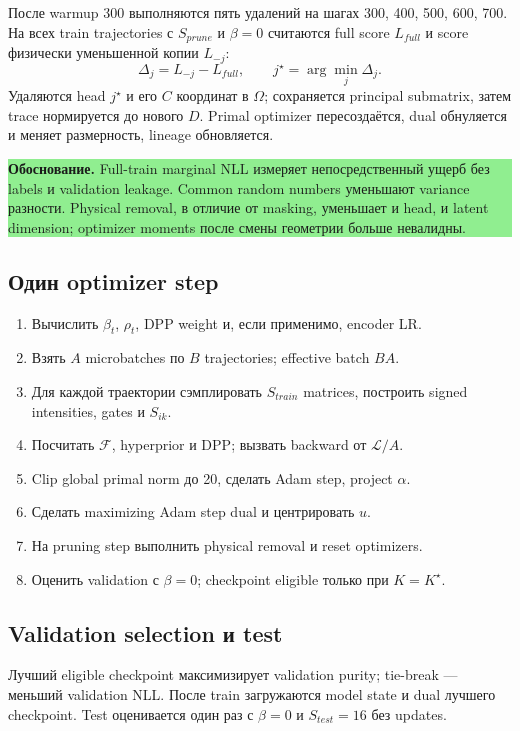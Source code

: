 \documentclass[11pt,a4paper]{article}
\newcommand{\Ktarget}{K^{\star}}
\newcommand{\boxnote}[2]{%
  \begin{center}\setlength{\fboxsep}{9pt}%
  \colorbox{#1}{\begin{minipage}{0.94\textwidth}\raggedright #2\par\end{minipage}}
  \end{center}}
\newcommand{\rationale}[1]{\boxnote{lightgreen}{\textbf{Обоснование.} #1}}
\begin{document}
После warmup 300 выполняются пять удалений на шагах 300, 400, 500, 600, 700.
На всех train trajectories с $S_{prune}$ и $\beta=0$ считаются full score
$L_{full}$ и score физически уменьшенной копии $L_{-j}$:
\[
\Delta_j=L_{-j}-L_{full},\qquad j^\star=\arg\min_j\Delta_j.
\]
Удаляются head $j^\star$ и его $C$ координат в $\Omega$; сохраняется principal
submatrix, затем trace нормируется до нового $D$. Primal optimizer
пересоздаётся, dual обнуляется и меняет размерность, lineage обновляется.

\rationale{Full-train marginal NLL измеряет непосредственный ущерб без labels и
validation leakage. Common random numbers уменьшают variance разности.
Physical removal, в отличие от masking, уменьшает и head, и latent dimension;
optimizer moments после смены геометрии больше невалидны.}

\subsection{Один optimizer step}

\begin{enumerate}
  \item Вычислить $\beta_t$, $\rho_t$, DPP weight и, если применимо, encoder LR.
  \item Взять $A$ microbatches по $B$ trajectories; effective batch $BA$.
  \item Для каждой траектории сэмплировать $S_{train}$ matrices, построить signed
  intensities, gates и $S_{ik}$.
  \item Посчитать $\mathcal F$, hyperprior и DPP; вызвать backward от
  $\mathcal L/A$.
  \item Clip global primal norm до 20, сделать Adam step, project $\alpha$.
  \item Сделать maximizing Adam step dual и центрировать $u$.
  \item На pruning step выполнить physical removal и reset optimizers.
  \item Оценить validation с $\beta=0$; checkpoint eligible только при
  $K=\Ktarget$.
\end{enumerate}

\subsection{Validation selection и test}

Лучший eligible checkpoint максимизирует validation purity; tie-break ---
меньший validation NLL. После train загружаются model state и dual лучшего
checkpoint. Test оценивается один раз с $\beta=0$ и $S_{test}=16$ без updates.
\end{document}
